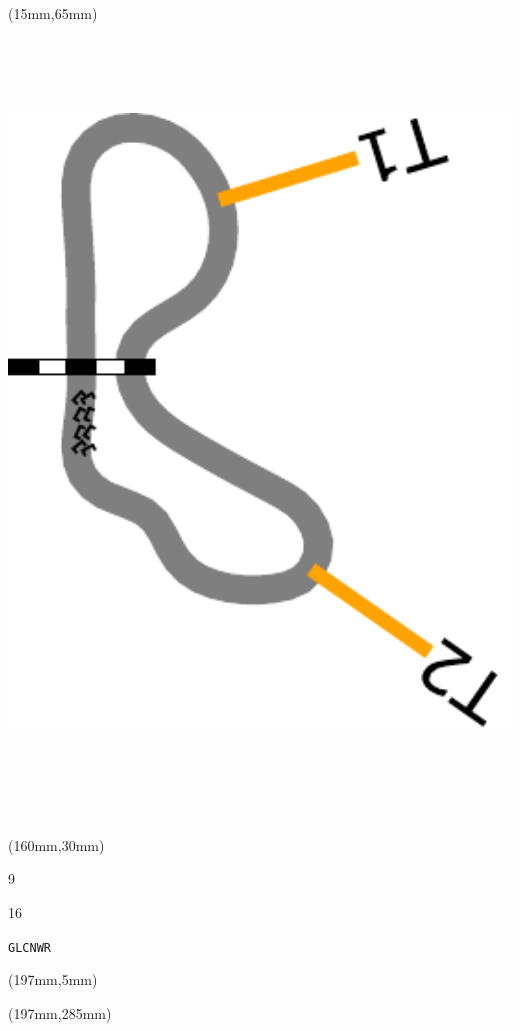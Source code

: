 \begin{textblock*}{185mm}(15mm,65mm)%
\centering
\mbox{\includegraphics[width=185mm,height=210mm,keepaspectratio]{PT/GLCNWR.pdf}}
\end{textblock*}
\begin{textblock*}{40mm}(160mm,30mm)%
\Large
\par{} 
\par9 
\par16 
\par\hfill\tiny\tt GLCNWR\\
\end{textblock*}
\begin{textblock*}{20mm}(197mm,5mm)%
\fbox{\thepage}
\label{GLCNWR}
\end{textblock*}
\begin{textblock*}{20mm}(197mm,285mm)%
\fbox{\thepage}
\end{textblock*}

